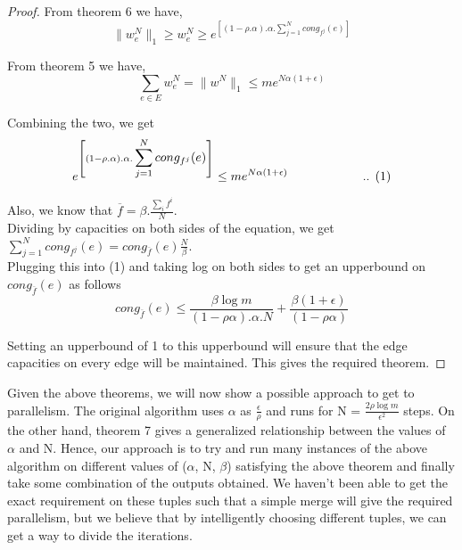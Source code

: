 \documentclass[BTech]{iitmdiss}
\begin{document}
	    \begin{proof}
	      From theorem 6 we have,
	      $$\|w_e^N\|_1 \geq w_e^N \geq e^{\left[ (1-\rho.\alpha). \alpha. \displaystyle\sum_{j=1}^N cong_{f^j}(e) \right]}$$
	      
	      From theorem 5 we have, 
	      $$\displaystyle\sum_{e \in E} w^N_e = \|w^N\|_1 \leq m e^{N\alpha(1+\epsilon)}$$
	      
	      Combining the two, we get 
	      $$e^{\left[ (1-\rho.\alpha). \alpha. \displaystyle\sum_{j=1}^N cong_{f^j}(e) \right]} \leq m e^{N\alpha(1+\epsilon)} \text{\hspace{20mm} .. (1)}$$
	      
	      Also, we know that $\overline{f} = \beta. \frac{\displaystyle\sum_{i}f^i }{N}$.\\
	      Dividing by capacities on both sides of the equation,
	      we get $\displaystyle\sum_{j=1}^N cong_{f^j}(e) = cong_{\overline{f}}(e) \frac{N}{\beta}$. \\
	      
	      Plugging this into (1) and taking log on both sides to get an upperbound on $cong_{\overline{f}}(e)$ as follows
	      $$cong_{\overline{f}}(e) \leq \frac{\beta \log m}{(1-\rho \alpha).\alpha.N} + \frac{\beta (1 + \epsilon)}{(1- \rho \alpha)}$$
	      
	      Setting an upperbound of 1 to this 
	      upperbound will ensure that the edge capacities on every edge will be maintained. This gives the required theorem.
	    \end{proof}
	    
	    Given the above theorems, we will now show a possible approach to get to parallelism. The original algorithm uses $\alpha$ as $\frac{\epsilon}{\rho}$
	    and runs for N = $\frac{2 \rho \log m}{\epsilon^2}$ steps. On the other hand, theorem 7 gives a generalized relationship between the values of 
	    $\alpha$ and N. Hence, our approach is to try and run many instances of the above algorithm on different values of ($\alpha$, N, $\beta$)
	    satisfying the above theorem and finally take some combination of the outputs obtained. We haven't been able to get the exact requirement on these 
	    tuples such that a simple merge will give the required parallelism, but we believe that by intelligently choosing different tuples, we can get a way to divide the iterations.
	    
	  
	    
\end{document}
